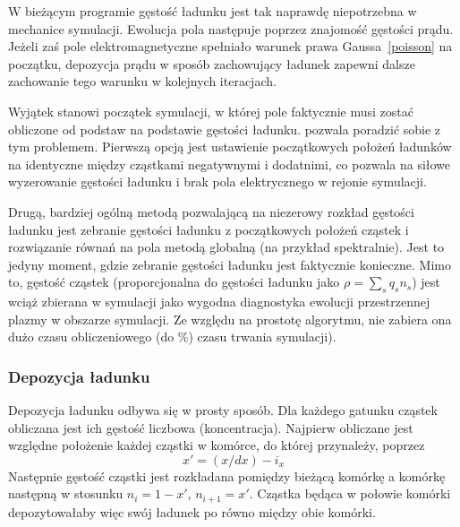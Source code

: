 W bieżącym programie gęstość ładunku jest tak naprawdę niepotrzebna w
mechanice symulacji. Ewolucja pola następuje poprzez znajomość gęstości prądu.
Jeżeli zaś pole elektromagnetyczne spełniało warunek
prawa Gaussa~\ref{poisson} na początku, depozycja prądu w sposób
zachowujący ładunek zapewni dalsze zachowanie tego warunku w kolejnych
iteracjach.~\cite{bunemanvillasenor}

Wyjątek stanowi początek symulacji, w której pole faktycznie musi zostać
obliczone od podstaw na podstawie gęstości ładunku. \pythonpic pozwala
poradzić sobie z tym problemem. Pierwszą opcją jest ustawienie początkowych
położeń ładunków na identyczne między cząstkami negatywnymi i dodatnimi, co
pozwala na siłowe wyzerowanie gęstości ładunku i brak pola elektrycznego w
rejonie symulacji.

Drugą, bardziej ogólną metodą pozwalającą na niezerowy rozkład gęstości
ładunku jest zebranie gęstości ładunku z początkowych położeń cząstek i
rozwiązanie równań na pola metodą globalną (na przykład spektralnie). Jest
to jedyny moment, gdzie zebranie gęstości ładunku jest faktycznie konieczne.
Mimo to, gęstość cząstek (proporcjonalna do gęstości ładunku jako $\rho =
\sum_s q_s n_s$) jest wciąż zbierana w symulacji jako wygodna diagnostyka
ewolucji przestrzennej plazmy w obszarze symulacji. Ze względu na prostotę
algorytmu, nie zabiera ona dużo czasu obliczeniowego (do
\%) czasu trwania symulacji).

\subsubsection{Depozycja ładunku}

 Depozycja ładunku odbywa się w prosty sposób. Dla każdego gatunku
cząstek obliczana jest ich gęstość liczbowa (koncentracja). Najpierw
obliczane jest względne położenie każdej cząstki w komórce, do której
przynależy, poprzez
\begin{equation}
x' = (x/dx) - i_x
\label{eqn:relative-position}
\end{equation}
Następnie gęstość cząstki jest rozkładana pomiędzy bieżącą komórkę a
komórkę następną w stosunku $n_i = 1-x'$, $n_{i+1} = x'$. Cząstka będąca
w połowie komórki depozytowałaby więc swój ładunek po równo między obie
komórki.


